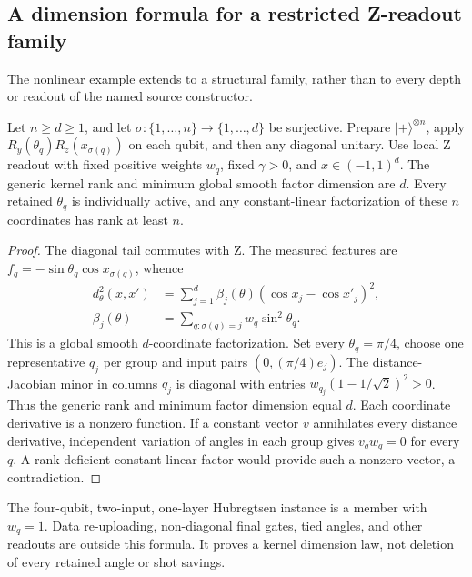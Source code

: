 \subsection{A dimension formula for a restricted Z-readout family}
\label{sec:hubfamily}
The nonlinear example extends to a structural family, rather than to
every depth or readout of the named source constructor.
\begin{proposition}\label{prop:hubfamily}
Let $n\ge d\ge1$, and let $\sigma:\{1,\ldots,n\}\to\{1,\ldots,d\}$
be surjective. Prepare $|+\rangle^{\otimes n}$, apply
$R_y(\theta_q)R_z(x_{\sigma(q)})$ on each qubit, and then any diagonal
unitary. Use local Z readout with fixed positive weights $w_q$, fixed
$\gamma>0$, and $x\in(-1,1)^d$. The generic kernel rank and minimum
global smooth factor dimension are $d$. Every retained $\theta_q$
is individually active, and any constant-linear factorization of
these $n$ coordinates has rank at least $n$.
\end{proposition}
\begin{proof}
The diagonal tail commutes with Z. The measured features are
$f_q=-\sin\theta_q\cos x_{\sigma(q)}$, whence
\begin{align}
 d^2_\theta(x,x')&=\sum_{j=1}^d\beta_j(\theta)
                    (\cos x_j-\cos x'_j)^2,\\
 \beta_j(\theta)&=\sum_{q:\sigma(q)=j}w_q\sin^2\theta_q.
\end{align}
This is a global smooth $d$-coordinate factorization. Set every
$\theta_q=\pi/4$, choose one representative $q_j$ per group and input
pairs $(0,(\pi/4)e_j)$. The distance-Jacobian minor in columns $q_j$
is diagonal with entries $w_{q_j}(1-1/\sqrt2)^2>0$.
Thus the generic rank and minimum factor dimension equal $d$.
Each coordinate derivative is a nonzero function. If a constant
vector $v$ annihilates every distance derivative, independent variation
of angles in each group gives $v_qw_q=0$ for every $q$. A
rank-deficient constant-linear factor would provide such a nonzero
vector, a contradiction.
\end{proof}
The four-qubit, two-input, one-layer Hubregtsen instance is a member
with $w_q=1$. Data re-uploading, non-diagonal final gates, tied angles,
and other readouts are outside this formula. It proves a kernel
dimension law, not deletion of every retained angle or shot savings.

